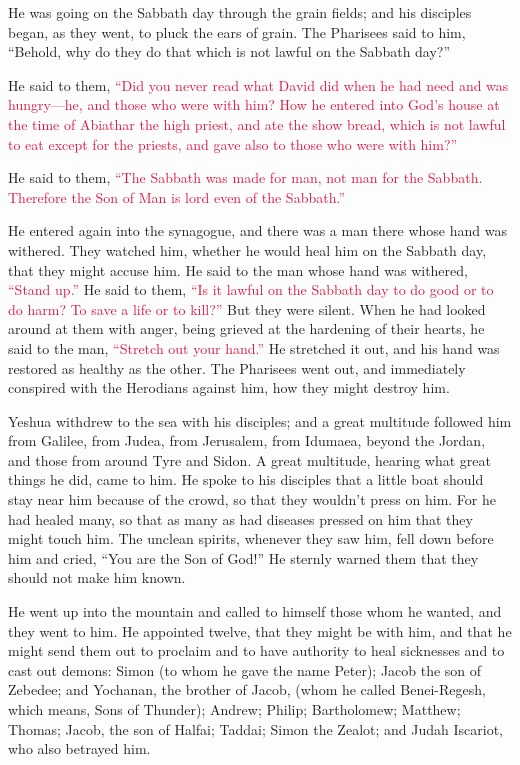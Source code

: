\myverse{}He was going on the Sabbath day through the grain fields; and
his disciples began, as they went, to pluck the ears of grain.
\myverse{}The Pharisees said to him, “Behold, why do they do that which is not lawful
on the Sabbath day?”

\myverse{}He said to them,
\textcolor{crimson}{“Did you never read what David did when he had need and was hungry—he, and those who were with him?
}
\myverse{}\textcolor{crimson}{How he entered into God’s house at the time of Abiathar the high priest,
	and ate the show bread, which is not lawful to eat except for the priests, and gave also to those who
	were with him?”}

\myverse{}He said to them,
\textcolor{crimson}{“The Sabbath was made for man, not man for the Sabbath.
}
\myverse{}\textcolor{crimson}{Therefore the Son of Man is lord even of the Sabbath.”}


\mychapter{} \myverse*{}He entered again into the synagogue, and there was a man there
whose hand was withered.
\myverse{}They watched him, whether he would heal him on the Sabbath day, that they might
accuse him.
\myverse{}He said to the man whose hand was withered,
\textcolor{crimson}{“Stand up.”}
\myverse{}He said to them,
\textcolor{crimson}{“Is it lawful on the Sabbath day to do good or to do harm? To save a life or to kill?”} But they
were silent.
\myverse{}When he had looked around at them with anger, being grieved at the hardening
of their hearts, he said to the man,
\textcolor{crimson}{“Stretch out your hand.”
} He stretched it out, and his hand was restored as healthy as the other.
\myverse{}The Pharisees went out, and immediately conspired with the Herodians against
him, how they might destroy him.

\myverse{}Yeshua withdrew to the sea with his disciples; and a great multitude
followed him from Galilee, from Judea,
\myverse{}from Jerusalem, from Idumaea, beyond the Jordan, and those from around Tyre
and Sidon. A great multitude, hearing what great things he did, came to him.
\myverse{}He spoke to his disciples that a little boat should stay near him because of
the crowd, so that they wouldn’t press on him.
\myverse{}For he had healed many, so that as many as had diseases pressed on him that
they might touch him.
\myverse{}The unclean spirits, whenever they saw him, fell down before him and cried,
“You are the Son of God!”
\myverse{}He sternly warned them that they should not make him known.

\myverse{}He went up into the mountain and called to himself those whom
he wanted, and they went to him.
\myverse{}He appointed twelve, that they might be with him, and that he might send them
out to proclaim
\myverse{}and to have authority to heal sicknesses and to cast out demons:
\myverse{}Simon (to whom he gave the name Peter);
\myverse{}Jacob the son of Zebedee; and Yochanan, the brother of Jacob, (whom he called
Benei-Regesh, which means, Sons of Thunder);
\myverse{}Andrew; Philip; Bartholomew; Matthew; Thomas; Jacob, the son of Halfai; Taddai;
Simon the Zealot;
\myverse{}and Judah Iscariot, who also betrayed him.

